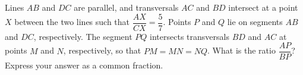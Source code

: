 Lines $AB$ and $DC$ are parallel, and transversals $AC$ and $BD$ intersect at a point $X$ between the two lines such that $\dfrac{AX}{CX}=\dfrac57$. Points $P$ and $Q$ lie on segments $AB$ and $DC$, respectively. The segment $PQ$ intersects transversals $BD$ and $AC$ at points $M$ and $N$, respectively, so that $PM=MN=NQ$. What is the ratio $\dfrac{AP}{BP}$? Express your answer as a common fraction.
